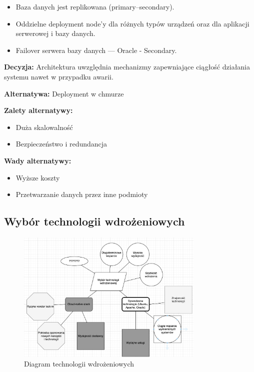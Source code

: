 \documentclass[12pt]{article}
\begin{document}
\begin{itemize}
\item Baza danych jest replikowana (primary–secondary).
\item Oddzielne deployment node'y dla różnych typów urządzeń oraz dla aplikacji serwerowej i bazy danych.
\item Failover serwera bazy danych — Oracle - Secondary.
\end{itemize}

\textbf{Decyzja:} Architektura uwzględnia mechanizmy zapewniające ciągłość działania systemu nawet w przypadku awarii.

\textbf{Alternatywa:} Deployment w chmurze

\textbf{Zalety alternatywy:}
\begin{itemize}
\item Duża skalowalność
\item Bezpieczeństwo i redundancja
\end{itemize}

\textbf{Wady alternatywy:}
\begin{itemize}
\item Wyższe koszty
\item Przetwarzanie danych przez inne podmioty
\end{itemize}

\subsection{Wybór technologii wdrożeniowych}
\begin{figure}[h]
\centering
\includegraphics[width=0.8\textwidth]{wybor_technologii_wdrozeniowej.png}
\caption{Diagram technologii wdrożeniowych}
\label{fig:deployment-tech}
\end{figure}
\end{document}
